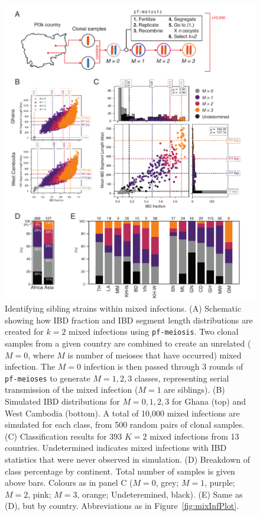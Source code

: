 \documentclass[9pt,lineno]{elife}
\begin{document}
\begin{figure}[htp]
  \begin{center}
  \includegraphics[width=\textwidth]{Fig6_corrected.pdf}
   \caption{Identifying sibling strains within mixed infections.  (A) Schematic showing how IBD fraction and IBD segment length distributions are created for $k=2$ mixed infections using \texttt{pf-meiosis}. Two clonal samples from a given country are combined to create an unrelated ($M=0$, where $M$ is number of meioses that have occurred) mixed infection.  The $M=0$ infection is then passed through 3 rounds of \texttt{pf-meioses} to generate $M=1,2,3$ classes, representing serial transmission of the mixed infection ($M=1$ are siblings). (B) Simulated IBD distributions for $M=0,1,2,3$ for Ghana (top) and West Cambodia (bottom). A total of 10,000 mixed infections are simulated for each class, from 500 random pairs of clonal samples. (C) Classification results for 393 $K=2$ mixed infections from 13 countries. Undetermined indicates mixed infections with IBD statistics that were never observed in simulation. (D) Breakdown of class percentage by continent. Total number of samples is given above bars. Colours as in panel C ($M=0$, grey; $M=1$, purple; $M=2$, pink; $M=3$, orange; Undeteremined, black). (E) Same as (D), but by country. Abbreviations as in Figure~\ref{fig:mixInfPlot}.}
   \label{fig:classify}
   \end{center}
\end{figure}
\end{document}
